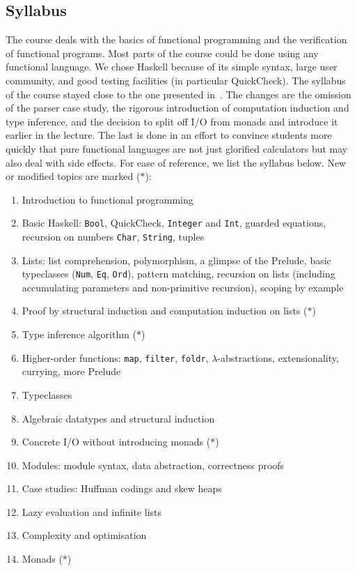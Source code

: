\subsection{Syllabus\label{sec:syllabus}}

The course deals with the basics of functional programming and the verification of functional programs.
Most parts of the course could be done using any functional language.
We chose Haskell because of its simple syntax, large user community, and good testing facilities (in particular QuickCheck).
The syllabus of the course stayed close to the one presented in~\cite{next_1100}.
The changes are the omission of the parser case study, the rigorous introduction of computation induction and type inference, and the decision to split off I/O from monads and introduce it earlier in the lecture.
The last is done in an effort to convince
students more quickly that pure functional languages are not just glorified calculators but may also deal with side effects.
For ease of reference, we list the syllabus below.
New or modified topics are marked ($\ast$):

\begin{multicols}{2}
\begin{enumerate}
  \item Introduction to functional programming
  \item Basic Haskell: \texttt{Bool}, QuickCheck, \texttt{Integer} and \texttt{Int}, guarded equations, recursion on numbers \texttt{Char}, \texttt{String}, tuples
  \item Lists: list comprehension, polymorphism, a glimpse of the Prelude, basic typeclasses (\texttt{Num}, \texttt{Eq}, \texttt{Ord}), pattern matching, recursion on lists (including accumulating parameters and non-primitive recursion), scoping by example
  \item Proof by structural induction and computation induction on lists ($\ast$)
  \item Type inference algorithm ($\ast$)
  \item Higher-order functions: \texttt{map}, \texttt{filter}, \texttt{foldr}, $\lambda$-abstractions, extensionality, currying, more Prelude
  \item Typeclasses
  \item Algebraic datatypes and structural induction
  \item Concrete I/O without introducing monads ($\ast$)
  \item Modules: module syntax, data abstraction, correctness proofs
  \item Case studies: Huffman codings and skew heaps
  \item Lazy evaluation and infinite lists
  \item Complexity and optimisation
  \item Monads ($\ast$)
\end{enumerate}
\end{multicols}

